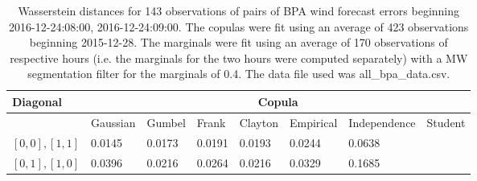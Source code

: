 \begin{table}[h] 
    \centering 
    \begin{tabular}{|l|l|l|l|l|l|l|l|} \hline 
        \textbf{Diagonal} & \multicolumn{7}{c|}{\textbf{Copula}} \\ \hline 
        & Gaussian & Gumbel & Frank & Clayton & Empirical & Independence & Student \\ \hline 
        $[0,0], [1,1]$ & 0.0145 & 0.0173 & 0.0191 & 0.0193 & 0.0244 & 0.0638 &  \\ \hline 
        $[0,1], [1,0]$ & 0.0396 & 0.0216 & 0.0264 & 0.0216 & 0.0329 & 0.1685 &  \\ \hline 
    \end{tabular} 
    \caption{Wasserstein distances for 143 observations of pairs of BPA wind forecast errors beginning 2016-12-24:08:00, 2016-12-24:09:00. The copulas were fit  using an average of 423 observations beginning 2015-12-28. The marginals were fit using an average of 170 observations of respective hours (i.e. the  marginals for the two hours were computed separately) with a MW segmentation filter for the marginals of 0.4. The data file used was all\_bpa\_data.csv.} 
\end{table}